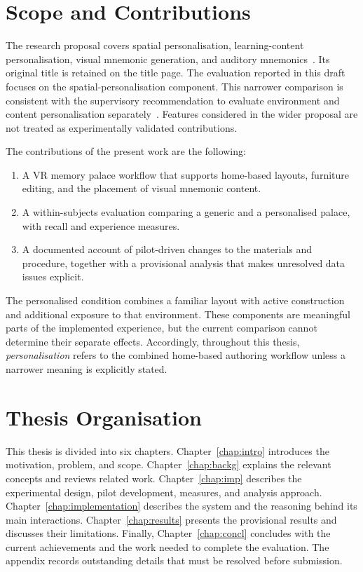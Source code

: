\section{Scope and Contributions}
The research proposal covers spatial personalisation, learning-content personalisation, visual mnemonic generation, and auditory mnemonics~\cite{sroorproposal}. Its original title is retained on the title page. The evaluation reported in this draft focuses on the spatial-personalisation component. This narrower comparison is consistent with the supervisory recommendation to evaluate environment and content personalisation separately~\cite{meetingjan2026}. Features considered in the wider proposal are not treated as experimentally validated contributions.

The contributions of the present work are the following:
\begin{enumerate}
    \item A VR memory palace workflow that supports home-based layouts, furniture editing, and the placement of visual mnemonic content.
    \item A within-subjects evaluation comparing a generic and a personalised palace, with recall and experience measures.
    \item A documented account of pilot-driven changes to the materials and procedure, together with a provisional analysis that makes unresolved data issues explicit.
\end{enumerate}

The personalised condition combines a familiar layout with active construction and additional exposure to that environment. These components are meaningful parts of the implemented experience, but the current comparison cannot determine their separate effects. Accordingly, throughout this thesis, \emph{personalisation} refers to the combined home-based authoring workflow unless a narrower meaning is explicitly stated.

\section{Thesis Organisation}
This thesis is divided into six chapters. Chapter~\ref{chap:intro} introduces the motivation, problem, and scope. Chapter~\ref{chap:backg} explains the relevant concepts and reviews related work. Chapter~\ref{chap:imp} describes the experimental design, pilot development, measures, and analysis approach. Chapter~\ref{chap:implementation} describes the system and the reasoning behind its main interactions. Chapter~\ref{chap:results} presents the provisional results and discusses their limitations. Finally, Chapter~\ref{chap:concl} concludes with the current achievements and the work needed to complete the evaluation. The appendix records outstanding details that must be resolved before submission.

